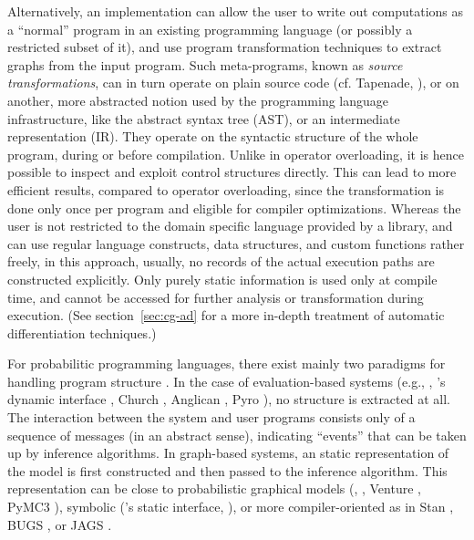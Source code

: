 Alternatively, an implementation can allow the user to write out computations as a \enquote{normal}
program in an existing programming language (or possibly a restricted subset of it), and use program
transformation techniques to extract graphs from the input program.  Such meta-programs, known as
\emph{source transformations}, can in turn operate on plain source code (cf. Tapenade,
\textcite{tapenadedevelopers2019tapenade}), or on another, more abstracted notion used by the
programming language infrastructure, like the abstract syntax tree (AST), or an intermediate
representation (IR).  They operate on the syntactic structure of the whole program, during or before
compilation.  Unlike in operator overloading, it is hence possible to inspect and exploit control
structures directly. This can lead to more efficient results, compared to operator overloading,
since the transformation is done only once per program and eligible for compiler optimizations.
Whereas the user is not restricted to the domain specific language provided by a library, and can
use regular language constructs, data structures, and custom functions rather freely, in this
approach, usually, no records of the actual execution paths are constructed explicitly.  Only purely
static information is used only at compile time, and cannot be accessed for further analysis or
transformation during execution.  (See section~\ref{sec:cg-ad} for a more in-depth treatment of
automatic differentiation techniques.)

For probabilitic programming languages, there exist mainly two paradigms for handling program
structure \parencite{vandemeent2018introduction}.  In the case of evaluation-based systems (e.g.,
\turingjl{} \parencite{ge2018turing}, 's dynamic interface
\parencite{cusumano-towner2020gen}, Church \parencite{goodman2012church}, Anglican
\parencite{wood2015new}, Pyro \parencite{bingham2018pyro}), no structure is extracted at all.  The
interaction between the system and user programs consists only of a sequence of messages (in an
abstract sense), indicating \enquote{events} that can be taken up by inference algorithms.  In
graph-based systems, an static representation of the model is first constructed and then passed to
the inference algorithm.  This representation can be close to probabilistic graphical models
(, \parencite{cox2018forneylab}, Venture
\parencite{mansinghka2014venture}, PyMC3 \parencite{salvatier2016probabilistic}), symbolic
('s static interface,  \parencite{scherrer2019soss}), or
more compiler-oriented as in Stan \parencite{carpenter2017stan}, BUGS \parencite{lunn2000winbugs},
or JAGS \parencite{plummer2003jags}.

